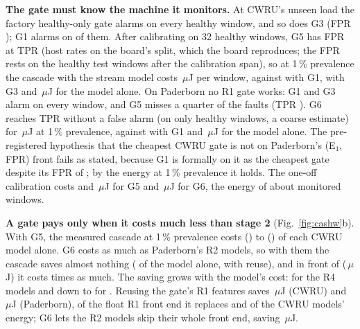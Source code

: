 \textbf{The gate must know the machine it monitors.} At CWRU's unseen load the factory healthy-only gate alarms on
every healthy window, and so does G3 (FPR \NumChCwFprEither{}); G1 alarms on \NumChCwFprSup{} of them. After
calibrating on 32 healthy windows, G5 has FPR \NumChCwFprFive{} at TPR \NumChCwTprFive{} (host rates on the
board's split, which the board reproduces; the FPR rests on the \NumChCwDeployHealthyN{} healthy test windows after
the calibration span), so at 1\,\% prevalence the cascade with
the stream model costs \NumChCwEPiFive{}\,$\mu$J per window, against \NumChCwEPiSup{} with G1,
\NumChCwEPiEither{} with G3 and \NumChCwETwoStream{}\,$\mu$J for the model alone. On Paderborn no R1 gate works:
G1 and G3 alarm on every window, and G5 misses a quarter of the faults (TPR \NumChPuTprFive{}). G6 reaches TPR
\NumChPuTprSix{} without a false alarm (on only \NumChPuDeployHealthyN{} healthy windows, a coarse estimate) for
\NumChPuEPiSix{}\,$\mu$J at 1\,\% prevalence, against \NumChPuEPiSup{} with G1 and \NumChPuETwoStream{}\,$\mu$J for
the model alone. The pre-registered hypothesis that the cheapest CWRU gate is not on Paderborn's (E$_1$, FPR) front
fails as stated, because G1 is formally on it as the cheapest gate despite its FPR of \NumChPuFprSup{}; by the energy at 1\,\%
prevalence it holds. The one-off calibration costs \NumChCwCalibSixteen{} and \NumChCwCalibThirtyTwo{}\,$\mu$J for
G5 and \NumChPuCalibOneTwentyEight{}\,$\mu$J for G6, the energy of about \NumChPuCalibWindows{} monitored windows.

\textbf{A gate pays only when it costs much less than stage 2} (Fig.~\ref{fig:cashw}b). With G5, the measured
cascade at 1\,\% prevalence costs \NumChCwBeMin{} (\NumChCwBeMinModel{}) to \NumChCwBeMax{} (\NumChCwBeMaxModel{})
of each CWRU model alone. G6 costs as much as Paderborn's R2 models, so with them the cascade saves almost nothing
(\NumChPuBeRTwo{} of the model alone, \NumChPuBeRTwoReuse{} with reuse), and in front of \NumChPuBeMaxModel{}
(\NumChPuDtROneE{}\,$\mu$J) it costs \NumChPuBeMax{} times as much. The saving grows with the model's cost:
\NumChPuBeRFour{} for the R4 models and down to \NumChPuBeMin{} for \NumChPuBeMinModel{}. Reusing the gate's R1 features saves \NumChCwReuseROne{}\,$\mu$J (CWRU) and
\NumChPuReuseROne{}\,$\mu$J (Paderborn), \NumChReuseOverExp{} of the float R1 front end it replaces and
\NumChCwReuseROnePct{} of the CWRU models' energy; G6 lets the R2 models skip their whole front end, saving
\NumChPuReuseRTwo{}\,$\mu$J.

